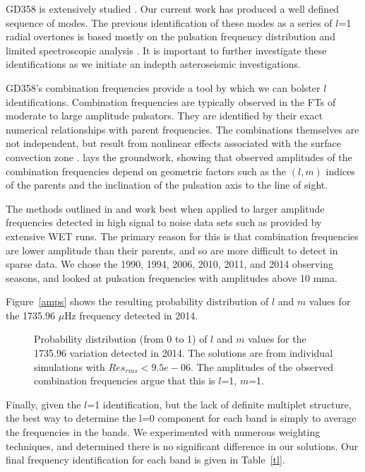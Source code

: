 \documentclass[12pt,preprint]{aastex}
\newcommand{\muHz}{\mbox{$\mu$Hz}}
\begin{document}
GD358 is extensively studied \citep{Montgomery10, Provencal09, Metcalfe00, Winget94}.  Our current 
work has produced a well defined sequence of modes. The previous identification of these modes as 
a series of $l$=1 radial overtones is based mostly on the pulsation frequency distribution 
and limited spectroscopic analysis \citep{Kotak02, Castanheira05}. It is important to further 
investigate these identifications as we initiate an indepth asteroseismic investigations.  

GD358's combination frequencies provide a tool by which we can bolster $l$ identifications. 
Combination frequencies are typically observed in the FTs of moderate to large amplitude pulsators.  
They are identified by their exact numerical relationships with parent frequencies.  
The combinations themselves are not independent, but result from nonlinear effects associated 
with the surface convection zone \citep{Brickhill92, Brassard95, Wu01, Ising01}.  
\citet{Wu01} lays the groundwork, showing that observed amplitudes of the combination 
frequencies depend on geometric factors such as the $(l,m)$ indices of the parents and the 
inclination of the pulsation axis to the line of sight.  

The methods outlined in \citet{Provencal12} and \citet{Montgomery10} work best when applied to 
larger amplitude frequencies detected in high signal to noise data sets such as provided by 
extensive WET runs.  The primary reason for this is that combination frequencies are lower 
amplitude than their parents, and so are more difficult to detect in sparse data.  We chose 
the 1990, 1994, 2006, 2010, 2011, and 2014 observing seasons, and looked at pulsation 
frequencies with amplitudes above 10 mma.  

Figure~\ref{amps} shows the resulting probability distribution of $l$ and $m$ values for the 1735.96 \muHz
frequency detected in 2014.   

\begin{figure}
 \caption{Probability distribution (from 0 to 1) of $l$ and $m$ values for the 1735.96 variation detected in 
 2014.  The solutions are from individual simulations with $Res_{rms}<9.5e-06$. The amplitudes of the 
 observed combination frequencies argue that this is $l$=1, $m$=1.  
 \label{modeamps}
 }
\end{figure}



Finally, given the $l$=1 identification, but the lack of definite multiplet structure, the best way to 
determine the l=0 component for each band is simply to average the frequencies in the bands.  We experimented
with numerous weighting techniques, and determined there is no significant difference in our solutions.  
Our final frequency identification for each band is given in Table~\ref{tl}.  
\end{document}
